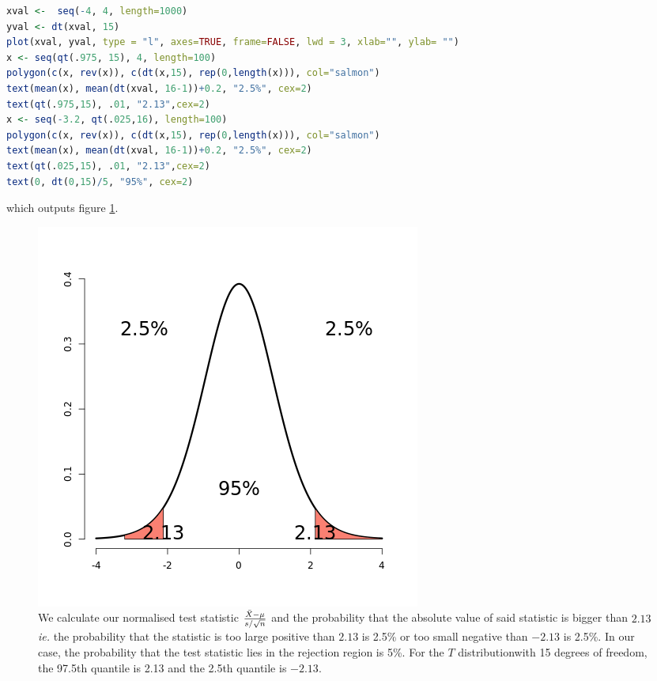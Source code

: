 \documentclass{homework}
\begin{document}
\begin{lstlisting}[language=R]
xval <-  seq(-4, 4, length=1000)
yval <- dt(xval, 15)
plot(xval, yval, type = "l", axes=TRUE, frame=FALSE, lwd = 3, xlab="", ylab= "")
x <- seq(qt(.975, 15), 4, length=100)
polygon(c(x, rev(x)), c(dt(x,15), rep(0,length(x))), col="salmon")
text(mean(x), mean(dt(xval, 16-1))+0.2, "2.5%", cex=2)
text(qt(.975,15), .01, "2.13",cex=2)
x <- seq(-3.2, qt(.025,16), length=100)
polygon(c(x, rev(x)), c(dt(x,15), rep(0,length(x))), col="salmon")
text(mean(x), mean(dt(xval, 16-1))+0.2, "2.5%", cex=2)
text(qt(.025,15), .01, "2.13",cex=2)
text(0, dt(0,15)/5, "95%", cex=2)
\end{lstlisting}

which outputs figure \ref{fig: two sided Student's T test}. \\

\clearpage

\begin{figure}
    \centering
    \includegraphics[scale=0.4]{figs/two sided T test.png}
    \caption{We calculate our normalised test statistic $\frac{\Bar{X}-\mu}{s/\sqrt{n}}$ and the probability that the absolute value of said statistic is bigger than $2.13$ \textit{ie.} the probability that the statistic is too large positive than $2.13$ is 2.5\% or too small negative than $-2.13$ is 2.5\%. In our case, the probability that the test statistic lies in the rejection region is 5\%. For the $T$ distributionwith 15 degrees of freedom, the 97.5th quantile is 2.13 and the 2.5th quantile is $-2.13$. }
    \label{fig: two sided Student's T test}
\end{figure}
\end{document}

